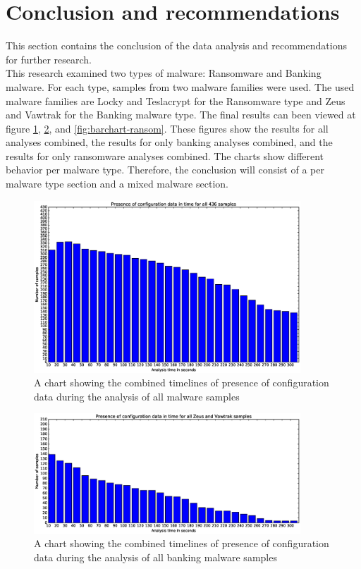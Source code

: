 \documentclass[conference]{IEEEtran}
\begin{document}
\section{Conclusion and recommendations}
This section contains the conclusion of the data analysis and recommendations for further research.\\ This research examined two types of malware: Ransomware and Banking malware. For each type, samples from two malware families were used. The used malware families are Locky and Teslacrypt for the Ransomware type and Zeus and Vawtrak for the Banking malware type. The final results can been viewed at figure \ref{fig:barchart-all}, \ref{fig:barchart-banking}, and \ref{fig:barchart-ransom}. These figures show the results for all analyses combined, the results for only banking analyses combined, and the results for only ransomware analyses combined. The charts show different behavior per malware type. Therefore, the conclusion will consist of a per malware type section and a mixed malware section.
\begin{figure}[!h]
    \includegraphics[width=10cm,scale=0.5]{images/final/final-barchart.eps}
    \caption{A chart showing the combined timelines of presence of configuration data during the analysis of all malware samples}
    \label{fig:barchart-all}
\end{figure}

\begin{figure}[!h]
    \includegraphics[width=10cm,scale=0.5]{images/final/banking-barchart.eps}
    \caption{A chart showing the combined timelines of presence of configuration data during the analysis of all banking malware samples}
    \label{fig:barchart-banking}
\end{figure}
\end{document}
